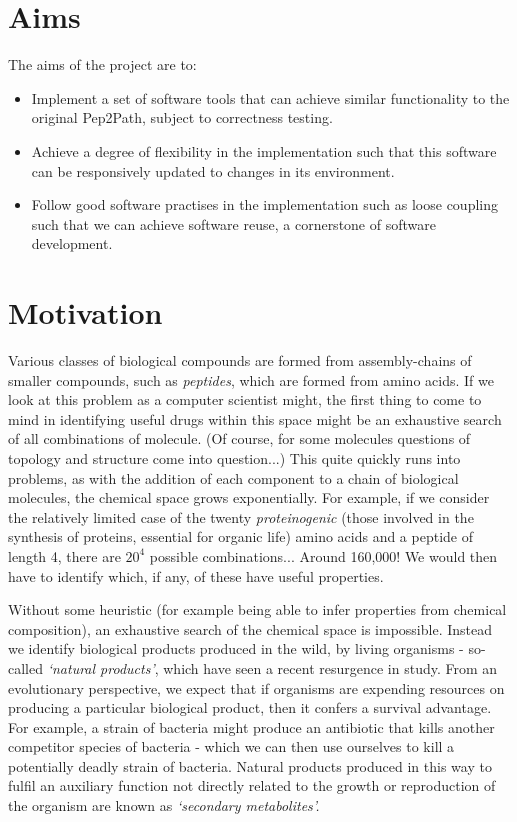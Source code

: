 \documentclass{l4proj}
\newcommand{\cit}[1]{\citep{#1}}
\begin{document}
\section{Aims}

The aims of the project are to:

\begin{itemize}
\item Implement a set of software tools that can achieve similar functionality to the original Pep2Path, subject to correctness testing.
\item Achieve a degree of flexibility in the implementation such that this software can be responsively updated to changes in its environment.
\item Follow good software practises in the implementation such as loose coupling such that we can achieve software reuse, a cornerstone of software development.
\end{itemize}

\section{Motivation} \label{motivation}

Various classes of biological compounds are formed from assembly-chains of smaller compounds, such as \textit{peptides}, which are formed from amino acids.
If we look at this problem as a computer scientist might, the first thing to come to mind in identifying useful drugs within this space might be an exhaustive search of all combinations of molecule.
(Of course, for some molecules questions of topology and structure come into question...)
This quite quickly runs into problems, as with the addition of each component to a chain of biological molecules, the chemical space grows exponentially.
For example, if we consider the relatively limited case of the twenty \textit{proteinogenic} (those involved in the synthesis of proteins, essential for organic life) amino acids and a peptide of length 4, there are \(20^4\) possible combinations... Around 160,000! We would then have to identify which, if any, of these have useful properties.

Without some heuristic (for example being able to infer properties from chemical composition), an exhaustive search of the chemical space is impossible.
Instead we identify biological products produced in the wild, by living organisms - so-called \textit{`natural products'}, which have seen a recent resurgence in study. \cit{natural}
From an evolutionary perspective, we expect that if organisms are expending resources on producing a particular biological product, then it confers a survival advantage.
For example, a strain of bacteria might produce an antibiotic that kills another competitor species of bacteria - which we can then use ourselves to kill a potentially deadly strain of bacteria.
Natural products produced in this way to fulfil an auxiliary function not directly related to the growth or reproduction of the organism are known as \textit{`secondary metabolites'.} \cit{metabolomics}
\end{document}
